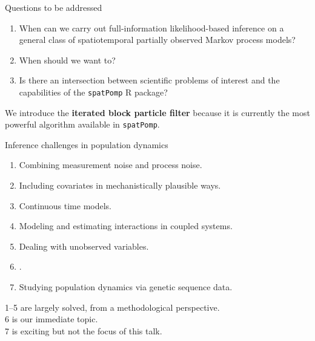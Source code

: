 \documentclass{beamer}
\begin{document}
\begin{frame}{Questions to be addressed}

  \begin{enumerate}
  \item When can we carry out full-information likelihood-based inference on a general class of spatiotemporal partially observed Markov process models?

    \vspace{2mm}
    
  \item When should we want to?

    \vspace{2mm}
    
  \item Is there an intersection between scientific problems of interest and the capabilities of the \texttt{spatPomp} R package?
  \end{enumerate}

  \vspace{10mm}

  We introduce the {\bf iterated block particle filter} because it is currently the most powerful algorithm available in \texttt{spatPomp}.

\end{frame}

\newcommand\challengeSep{\vspace{3mm}}

\begin{frame}{Inference challenges in population dynamics}

  \begin{enumerate}
\item Combining measurement noise and process noise.
\item Including covariates in mechanistically plausible ways.
\item  Continuous time models.
\item  Modeling and estimating interactions in coupled systems.
\item  Dealing with unobserved variables.
\item  {}.
\item  Studying population dynamics via genetic sequence data.
  \end{enumerate}

  \vspace{4mm}
  
  1--5 are largely solved, from a methodological perspective.\\
  6 is our immediate topic.\\
  7 is exciting but not the focus of this talk.


  \vspace{4mm}

  
\end{frame}
\end{document}
